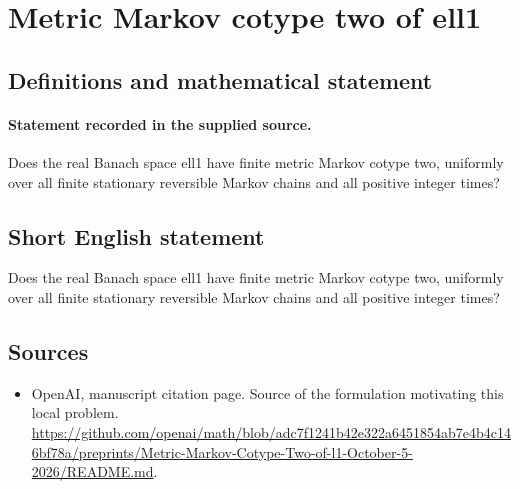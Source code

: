 \documentclass[11pt]{article}
\begin{document}
\section*{Metric Markov cotype two of ell1}\label{30007180}
\subsection{Definitions and mathematical statement}
\paragraph{Statement recorded in the supplied source.}
Does the real Banach space ell1 have finite metric Markov cotype two, uniformly over all finite stationary reversible Markov chains and all positive integer times?
\subsection{Short English statement}
Does the real Banach space ell1 have finite metric Markov cotype two, uniformly over all finite stationary reversible Markov chains and all positive integer times?
\subsection{Sources}
\begin{itemize}
\item[S1] OpenAI, manuscript citation page. Source of the formulation motivating this local problem.
\url{https://github.com/openai/math/blob/adc7f1241b42e322a6451854ab7e4b4c146bf78a/preprints/Metric-Markov-Cotype-Two-of-l1-October-5-2026/README.md}.
\end{itemize}
\end{document}
